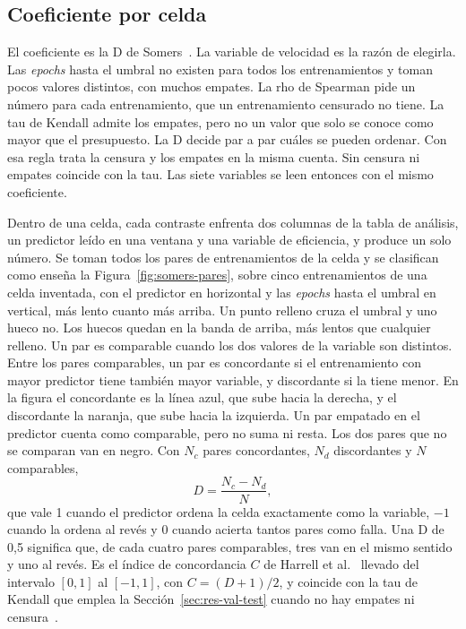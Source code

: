 \subsection{Coeficiente por celda}
\label{sec:protocolo-coeficiente}

El coeficiente es la D de Somers~\cite{somers1962new}. La variable de velocidad es la razón de elegirla. Las \emph{epochs} hasta el umbral no existen para todos los entrenamientos y toman pocos valores distintos, con muchos empates. La rho de Spearman pide un número para cada entrenamiento, que un entrenamiento censurado no tiene. La tau de Kendall admite los empates, pero no un valor que solo se conoce como mayor que el presupuesto. La D decide par a par cuáles se pueden ordenar. Con esa regla trata la censura y los empates en la misma cuenta. Sin censura ni empates coincide con la tau. Las siete variables se leen entonces con el mismo coeficiente.

Dentro de una celda, cada contraste enfrenta dos columnas de la tabla de análisis, un predictor leído en una ventana y una variable de eficiencia, y produce un solo número. Se toman todos los pares de entrenamientos de la celda y se clasifican como enseña la Figura~\ref{fig:somers-pares}, sobre cinco entrenamientos de una celda inventada, con el predictor en horizontal y las \emph{epochs} hasta el umbral en vertical, más lento cuanto más arriba. Un punto relleno cruza el umbral y uno hueco no. Los huecos quedan en la banda de arriba, más lentos que cualquier relleno. Un par es comparable cuando los dos valores de la variable son distintos. Entre los pares comparables, un par es concordante si el entrenamiento con mayor predictor tiene también mayor variable, y discordante si la tiene menor. En la figura el concordante es la línea azul, que sube hacia la derecha, y el discordante la naranja, que sube hacia la izquierda. Un par empatado en el predictor cuenta como comparable, pero no suma ni resta. Los dos pares que no se comparan van en negro. Con $N_c$ pares concordantes, $N_d$ discordantes y $N$ comparables,
\begin{equation}
D = \frac{N_c - N_d}{N},
\label{eq:somers-d}
\end{equation}
que vale 1 cuando el predictor ordena la celda exactamente como la variable, $-1$ cuando la ordena al revés y 0 cuando acierta tantos pares como falla. Una D de 0,5 significa que, de cada cuatro pares comparables, tres van en el mismo sentido y uno al revés. Es el índice de concordancia $C$ de Harrell et al.~\cite{harrell1982evaluating,harrell1996multivariable} llevado del intervalo $[0, 1]$ al $[-1, 1]$, con $C = (D + 1)/2$, y coincide con la tau de Kendall que emplea la Sección~\ref{sec:res-val-test} cuando no hay empates ni censura~\cite{newson2002parameters}.

